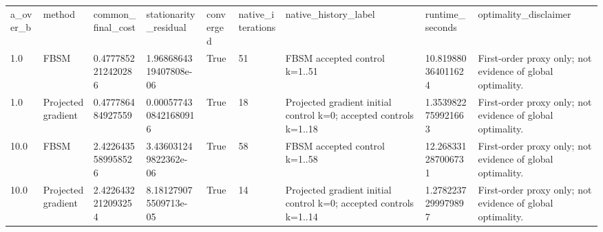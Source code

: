 \begin{tabular}{lllllllll}
a\_over\_b & method & common\_final\_cost & stationarity\_residual & converged & native\_iterations & native\_history\_label & runtime\_seconds & optimality\_disclaimer \\
1.0 & FBSM & 0.4777852212420286 & 1.9686864319407808e-06 & True & 51 & FBSM accepted control k=1..51 & 10.819880364011624 & First-order proxy only; not evidence of global optimality. \\
1.0 & Projected gradient & 0.477786484927559 & 0.0005774308421680916 & True & 18 & Projected gradient initial control k=0; accepted controls k=1..18 & 1.3539822759921663 & First-order proxy only; not evidence of global optimality. \\
10.0 & FBSM & 2.4226435589958526 & 3.436031249822362e-06 & True & 58 & FBSM accepted control k=1..58 & 12.268331287006731 & First-order proxy only; not evidence of global optimality. \\
10.0 & Projected gradient & 2.4226432212093254 & 8.181279075509713e-05 & True & 14 & Projected gradient initial control k=0; accepted controls k=1..14 & 1.2782237299979897 & First-order proxy only; not evidence of global optimality. \\
\end{tabular}
